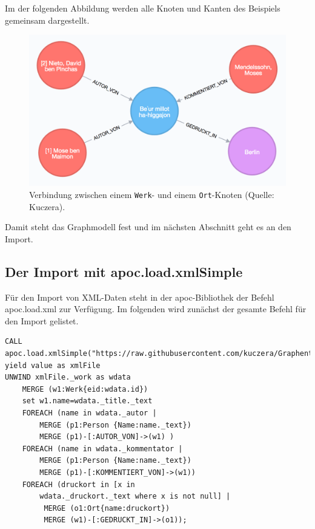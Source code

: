 Im der folgenden Abbildung werden alle Knoten und Kanten des Beispiels
gemeinsam dargestellt.

\begin{figure}
\centering
\includegraphics{Bilder/Werk-gesamt.png}
\caption{Verbindung zwischen einem \texttt{Werk}- und einem
\texttt{Ort}-Knoten (Quelle: Kuczera).}
\end{figure}

Damit steht das Graphmodell fest und im nächsten Abschnitt geht es an
den Import.

\hypertarget{der-import-mit-apoc.load.xmlsimple}{%
\subsection{Der Import mit
apoc.load.xmlSimple}\label{der-import-mit-apoc.load.xmlsimple}}

Für den Import von XML-Daten steht in der apoc-Bibliothek der Befehl
apoc.load.xml zur Verfügung. Im folgenden wird zunächst der gesamte
Befehl für den Import gelistet.

\begin{verbatim}
CALL apoc.load.xmlSimple("https://raw.githubusercontent.com/kuczera/Graphentechnologien/master/docs/data/kollatz.xml") yield value as xmlFile
UNWIND xmlFile._work as wdata
    MERGE (w1:Werk{eid:wdata.id})
    set w1.name=wdata._title._text
    FOREACH (name in wdata._autor |
        MERGE (p1:Person {Name:name._text})
        MERGE (p1)-[:AUTOR_VON]->(w1) )
    FOREACH (name in wdata._kommentator |
        MERGE (p1:Person {Name:name._text})
        MERGE (p1)-[:KOMMENTIERT_VON]->(w1))
    FOREACH (druckort in [x in
        wdata._druckort._text where x is not null] |
         MERGE (o1:Ort{name:druckort})
         MERGE (w1)-[:GEDRUCKT_IN]->(o1));
\end{verbatim}

